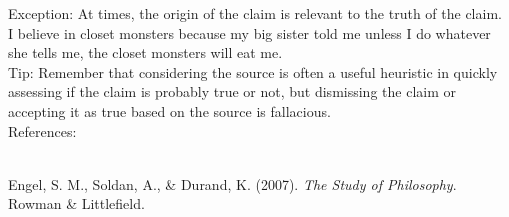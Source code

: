 \documentclass[a4paper,12pt,single,pdftex]{scrbook}
\begin{document}
{    
      Exception: At times, the origin of the claim is relevant to the truth of the claim. 
    \\

    
      I believe in closet monsters because my big sister told me unless I do whatever she tells me, the closet monsters will eat me.
    \\

    
      Tip: Remember that considering the source is often a useful heuristic in quickly assessing if the claim is probably true or not, but dismissing the claim or accepting it as true based on the source is fallacious.
    \\

    References:

    
      
        
      \\

      
        
          Engel, S. M., Soldan, A., \& Durand, K. (2007). {\it The Study of Philosophy}. Rowman \& Littlefield.
        
      
    
  }
\end{document}
